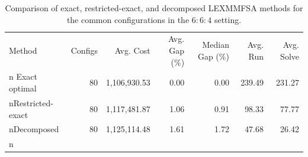 \begin{table}[t]
\centering
\caption{Comparison of exact, restricted-exact, and decomposed LEXMMFSA methods for the common configurations in the $6{:}6{:}4$ setting.}\n\label{tab:lexmmfsa_s664_threeway}\n\begin{tabular}{lrrrrrr}\n\hline
Method & Configs & Avg. Cost & Avg. Gap (\%) & Median Gap (\%) & Avg. Run & Avg. Solve \\n\hline
Exact optimal & 80 & 1,106,930.53 & 0.00 & 0.00 & 239.49 & 231.27 \\nRestricted-exact & 80 & 1,117,481.87 & 1.06 & 0.91 & 98.33 & 77.77 \\nDecomposed & 80 & 1,125,114.48 & 1.61 & 1.72 & 47.68 & 26.42 \\n\hline
\end{tabular}\n\end{table}\n